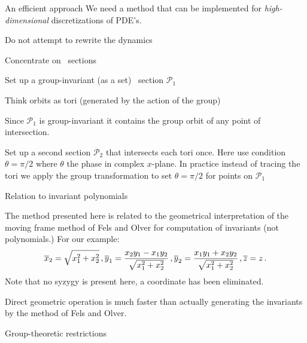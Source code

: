\documentclass{theo1poster}[2003/04/25]
\renewcommand{\labelitemi}{\ding{228}}
\renewenvironment{itemize}%
 {\begin{list}{\labelitemi}%
       {%
        \setlength{\leftmargin}{0pt}%
        \setlength{\itemindent}{0pt}%
        \settowidth{\labelwidth}{\labelitemi}%
        \addtolength{\labelsep}{\itemindent}
        \addtolength{\leftmargin}{\labelwidth}%
        \addtolength{\leftmargin}{\labelsep}%
        \addtolength{\leftmargin}{-\itemindent}%
       }%
 }
 {\end{list}}
\begin{document}
\begin{poster}{3}
\begin{sheet}{An efficient approach}
\large
We need a method that can be implemented for \emph{high-dimensional} discretizations of PDE's.
\begin{itemize}
 \item Do not attempt to rewrite the dynamics
 \item Concentrate on \Poincare~sections
 \item Set up a group-invariant (as a set) \Poincare~section $\mathcal{P}_1$
 \item Think orbits as tori (generated by the action of the group)
 \item Since $\mathcal{P}_1$ is group-invariant it contains the group
	orbit of any point of intersection. 
 \item Set up a second section $\mathcal{P}_2$ that intersects each tori once. 
	Here use condition $\theta=\pi/2$ where $\theta$ the phase in complex $x$-plane. In practice instead of tracing the tori we apply the group transformation to set $\theta=\pi/2$ for points on $\mathcal{P}_1$ 
\end{itemize}
 
\end{sheet}

\begin{sheet}{Relation to invariant polynomials}

\large 
The method presented here is related to the geometrical interpretation
of the moving frame method of Fels and Olver for computation of invariants 
(not polynomials.) For our example:
\[
	\overline{x}_2 = \sqrt{x_1^2+x_2^2} \,, \\
	\overline{y}_1 = \frac{x_2 y_1-x_1 y_2}{\sqrt{x_1^2+x_2^2}}\,, \\
	\overline{y}_2 =\frac{x_1 y_1+x_2 y_2}{\sqrt{x_1^2+x_2^2}}\,, \\ 
	\overline{z}= z\,.
\]
Note that no syzygy is present here, a coordinate has been eliminated.
\begin{itemize}
 \item Direct geometric operation is much faster than actually generating
	the invariants by the method of Fels and Olver.
 \item Group-theoretic restrictions
\end{itemize}
 
\end{sheet}


\end{poster}
\end{document}
